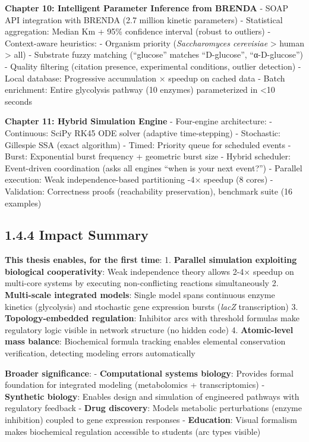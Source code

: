 \textbf{Chapter 10: Intelligent Parameter Inference from BRENDA} - SOAP
API integration with BRENDA (2.7 million kinetic parameters) -
Statistical aggregation: Median Km + 95\% confidence interval (robust to
outliers) - Context-aware heuristics: - Organism priority
(\emph{Saccharomyces cerevisiae} \textgreater{} human \textgreater{}
all) - Substrate fuzzy matching (``glucose'' matches ``D-glucose'',
``α-D-glucose'') - Quality filtering (citation presence, experimental
conditions, outlier detection) - Local database: Progressive
accumulation × speedup on cached data - Batch enrichment: Entire
glycolysis pathway (10 enzymes) parameterized in \textless10 seconds

\textbf{Chapter 11: Hybrid Simulation Engine} - Four-engine
architecture: - Continuous: SciPy RK45 ODE solver (adaptive
time-stepping) - Stochastic: Gillespie SSA (exact algorithm) - Timed:
Priority queue for scheduled events - Burst: Exponential burst frequency
+ geometric burst size - Hybrid scheduler: Event-driven coordination
(asks all engines ``when is your next event?'') - Parallel execution:
Weak independence-based partitioning -4× speedup (8 cores) -
Validation: Correctness proofs (reachability preservation), benchmark
suite (16 examples)

\hypertarget{impact-summary}{%
\subsection{1.4.4 Impact Summary}\label{impact-summary}}

\textbf{This thesis enables, for the first time}: 1. \textbf{Parallel
simulation exploiting biological cooperativity}: Weak independence
theory allows 2-4× speedup on multi-core systems by executing
non-conflicting reactions simultaneously 2. \textbf{Multi-scale
integrated models}: Single model spans continuous enzyme kinetics
(glycolysis) and stochastic gene expression bursts (\emph{lacZ}
transcription) 3. \textbf{Topology-embedded regulation}: Inhibitor arcs
with threshold formulas make regulatory logic visible in network
structure (no hidden code) 4. \textbf{Atomic-level mass balance}:
Biochemical formula tracking enables elemental conservation
verification, detecting modeling errors automatically

\textbf{Broader significance}: - \textbf{Computational systems biology}:
Provides formal foundation for integrated modeling (metabolomics +
transcriptomics) - \textbf{Synthetic biology}: Enables design and
simulation of engineered pathways with regulatory feedback -
\textbf{Drug discovery}: Models metabolic perturbations (enzyme
inhibition) coupled to gene expression responses - \textbf{Education}:
Visual formalism makes biochemical regulation accessible to students
(arc types visible)

